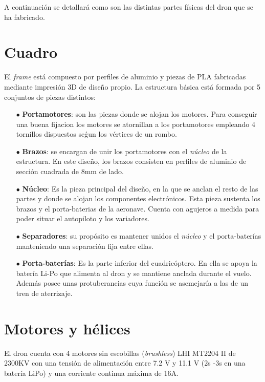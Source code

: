 A continuación se detallará como son las distintas partes físicas del dron que se ha fabricado.



\section{Cuadro}
El \textit{frame} está compuesto por perfiles de aluminio y piezas de PLA fabricadas mediante impresión 3D de diseño propio. La estructura básica está formada por 5 conjuntos de piezas distintos:
\begin{itemize}
	\item[$\bullet$] \textbf{Portamotores}: son las piezas donde se alojan los motores. Para conseguir una buena fijacion los motores se atornillan a los portamotores empleando 4 tornillos dispuestos seǵun los vértices de un rombo.
	
	
	\item [$\bullet$] \textbf{Brazos}: se encargan de unir los portamotores con el \textit{núcleo} de la estructura. En este diseño, los brazos consisten en perfiles de aluminio de sección cuadrada de 8mm de lado.
	
	\item [$\bullet$] \textbf{Núcleo}: Es la pieza principal del diseño, en la que se anclan el resto de las partes y donde se alojan los componentes electrónicos. Esta pieza sustenta los brazos y el porta-baterias de la aeronave. Cuenta con agujeros a medida para poder situar el autopiloto y los variadores.
	
	 
	\item [$\bullet$] \textbf{Separadores}: su propósito es mantener unidos el \textit{núcleo} y el porta-baterías manteniendo una separación fija entre ellas.
	
	
	\item [$\bullet$] \textbf{Porta-baterías}: Es la parte inferior del cuadricóptero. En ella se apoya la batería Li-Po que alimenta al dron y se mantiene anclada durante el vuelo. Además posee unas protuberancias cuya función se asemejaría a las de un tren de aterrizaje.  
	
	
	  
\end{itemize} 

\section{Motores y hélices}
El dron cuenta con 4 motores sin escobillas (\textit{brushless}) LHI MT2204 II de 2300KV con una tensión de alimentación entre 7.2 V y 11.1 V (2s -3s en una batería LiPo) y una corriente continua máxima de 16A.

